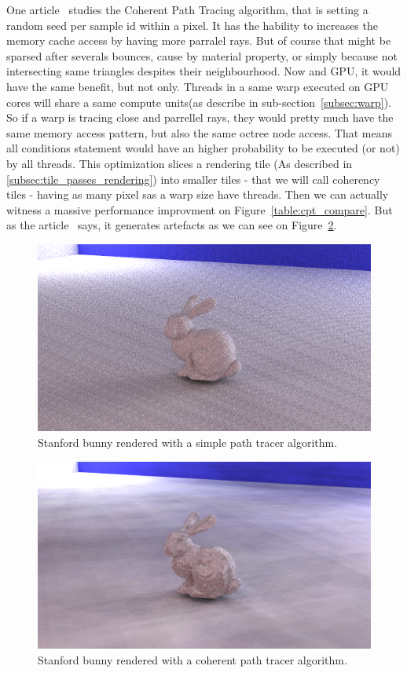 One article~\cite{cpt} studies the Coherent Path Tracing algorithm, that is setting a
random seed per sample id within a pixel. It has the hability to increases the
memory cache access by having more parralel rays. But of course that might be
sparsed after severals bounces, cause by material property, or simply because
not intersecting same triangles despites their neighbourhood. Now and GPU, it
would have the same benefit, but not only. Threads in a same warp executed on
GPU cores will share a same compute units(as describe in sub-section~\ref{subsec:warp}). So
if a warp is tracing close and parrellel rays, they would pretty much have
the same memory access pattern, but also the same octree node access. That means
all conditions statement would have an higher probability to be executed (or not)
by all threads. This optimization slices a rendering tile (As described
in \ref{subsec:tile_passes_rendering}) into smaller tiles - that we will call
coherency tiles - having as many pixel sas a warp size have threads. Then we can
actually witness a massive performance improvment on Figure~\ref{table:cpt_compare}.
But as the article~\cite{cpt} says, it generates artefacts as we can see on
Figure~\ref{fig:stanford_bunny_cpt}.

\begin{figure}[h]
    \centering
    \includegraphics[width=0.8\columnwidth]{render_stanford_bunny_dummy.png}
    \caption{Stanford bunny rendered with a simple path tracer algorithm.}
    \label{fig:stanford_bunny_dummy}
\end{figure}

\begin{figure}[h]
    \centering
    \includegraphics[width=0.8\columnwidth]{render_stanford_bunny_cpt.png}
    \caption{Stanford bunny rendered with a coherent path tracer algorithm.}
    \label{fig:stanford_bunny_cpt}
\end{figure}

